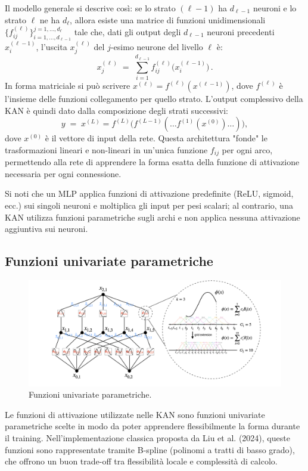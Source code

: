 \documentclass[a4paper,12pt]{report}
\begin{document}
	Il modello generale si descrive così: se lo strato $(\ell-1)$ ha $d_{\ell-1}$ neuroni e lo strato $\ell$ ne ha $d_\ell$, allora esiste una matrice di funzioni unidimensionali $\{f^{(\ell)}_{ij}\}_{i=1,\dots,d_{\ell-1}}^{j=1,\dots,d_\ell}$ tale che, dati gli output degli $d_{\ell-1}$ neuroni precedenti $x_i^{(\ell-1)}$, l’uscita $x_j^{(\ell)}$ del $j$-esimo neurone del livello $\ell$ è: 
	\[
	x_j^{(\ell)} \;=\; \sum_{i=1}^{d_{\ell-1}} f^{(\ell)}_{ij}\bigl(x_i^{(\ell-1)}\bigr)\,.
	\] 
	In forma matriciale si può scrivere $x^{(\ell)} = f^{(\ell)}(x^{(\ell-1)})$, dove $f^{(\ell)}$ è l’insieme delle funzioni collegamento per quello strato. L’output complessivo della KAN è quindi dato dalla composizione degli strati successivi: 
	\[
	y \;=\; x^{(L)} 
	= f^{(L)}\bigl(f^{(L-1)}(\dots f^{(1)}(x^{(0)})\dots)\bigr)\!,
	\] 
	dove $x^{(0)}$ è il vettore di input della rete. Questa architettura "fonde" le trasformazioni lineari e non-lineari in un'unica funzione $f_{ij}$ per ogni arco, permettendo alla rete di apprendere la forma esatta della funzione di attivazione necessaria per ogni connessione.
	
	Si noti che un MLP applica funzioni di attivazione predefinite (ReLU, sigmoid, ecc.) sui singoli neuroni e moltiplica gli input per pesi scalari; al contrario, una KAN utilizza funzioni parametriche sugli archi e non applica nessuna attivazione aggiuntiva sui neuroni.
	
	\subsection{Funzioni univariate parametriche}
	
	\begin{figure}[H]
		\centering
		\includegraphics[width=1.0\textwidth]{img/fup.png}
		\caption{Funzioni univariate parametriche.}
	\end{figure}
	
	Le funzioni di attivazione utilizzate nelle KAN sono funzioni univariate parametriche scelte in modo da poter apprendere flessibilmente la forma durante il training. Nell’implementazione classica proposta da Liu et al. (2024), queste funzioni sono rappresentate tramite B-spline (polinomi a tratti di basso grado), che offrono un buon trade-off tra flessibilità locale e complessità di calcolo. \\
	
\end{document}
